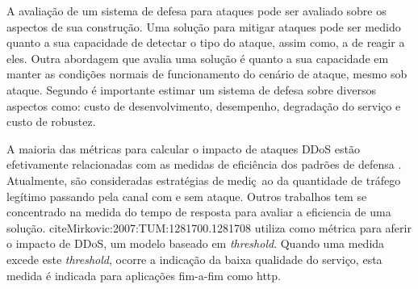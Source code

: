 
A avaliação de um sistema de defesa para ataques pode ser avaliado sobre os aspectos de sua construção. Uma solução para mitigar ataques pode ser medido quanto a sua capacidade de detectar o tipo do ataque, assim como, a de reagir a eles. Outra abordagem que avalia uma solução é quanto a sua capacidade em manter as condições normais de funcionamento do cenário de ataque, mesmo sob ataque. Segundo \cite{4600003} é importante estimar um sistema de defesa sobre diversos aspectos como: custo de desenvolvimento, desempenho, degradação do serviço e custo de robustez. 

A maioria das métricas para calcular o impacto de ataques DDoS estão efetivamente relacionadas com as medidas de eficiência dos padrões de defensa \cite{4809152}. Atualmente, são consideradas estratégias de mediç~ao da quantidade de tráfego legítimo passando pela canal com e sem ataque. Outros trabalhos tem se concentrado na medida do tempo de resposta para avaliar a eficiencia de uma solução. cite{Mirkovic:2007:TUM:1281700.1281708} utiliza como métrica para aferir o impacto de DDoS, um modelo baseado em \emph{threshold}. Quando uma medida excede este \emph{threshold}, ocorre a  indicação da baixa qualidade do serviço, esta medida é indicada para aplicações fim-a-fim como http.
